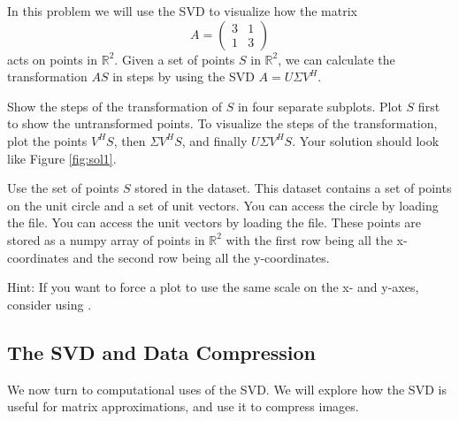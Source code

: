 \begin{problem}
In this problem we will use the SVD to visualize how the matrix
\begin{equation}
A =  \begin{pmatrix}3 & 1\\1 & 3\end{pmatrix}
\end{equation}
acts on points in $\mathbb{R}^2$.
Given a set of points $S$ in $\mathbb{R}^2$, we can calculate the transformation $AS$ in steps by using the SVD $A = U\Sigma V^H$.

Show the steps of the transformation of $S$ in four separate subplots.
Plot $S$ first to show the untransformed points.
To visualize the steps of the transformation, plot the points $V^HS$, then $\Sigma V^HS$, and finally $U\Sigma V^HS$.
Your solution should look like Figure \ref{fig:sol1}.

Use the set of points $S$ stored in the  dataset.
This dataset contains a set of points on the unit circle and a set of unit vectors. 
You can access the circle by loading the  file. 
You can access the unit vectors by loading the  file. 
These points are stored as a numpy array of points in $\mathbb{R}^2$ with the first row being all the x-coordinates and the second row being all the y-coordinates.

Hint: If you want to force a plot to use the same scale on the x- and y-axes, consider using .
\end{problem}

\subsection*{The SVD and Data Compression}
We now turn to computational uses of the SVD. We will explore how the SVD is useful for matrix approximations, and use it to compress images.

